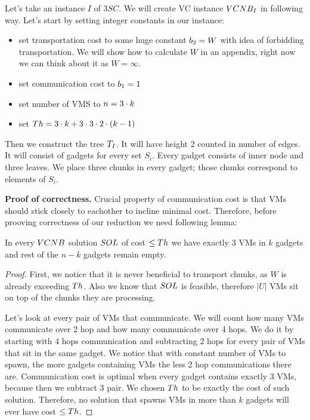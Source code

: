 Let's take an instance $I$ of $3SC$. We will create VC instance $VCNB_I$ in following
way. Let's start by setting integer constants in our instance:
\begin{itemize}
\item set transportation cost to some huge constant $b_2 = W$
  with idea of forbidding transportation. We will show how to
  calculate $W$ in an appendix, right now we can think about it as $W
  = \infty$.
\item set communication cost to $b_1 = 1$
\item set number of VMS to $n = 3 \cdot k$
\item set $Th =  3 \cdot k + 3 \cdot 3 \cdot 2 \cdot (k - 1)$
\end{itemize}


Then we construct the tree $T_I$. It will have height 2 counted in number of
edges. It will consist of gadgets for every set $S_i$. Every gadget
consists of inner node and three leaves. We place three chunks in
every gadget; those chunks correspond to elements of $S_i$.

\textbf{Proof of correctness.}
Crucial property of communication cost is that VMs should stick
closely to eachother to incline minimal cost. Therefore, before
prooving correctness of our reduction we need following lemma:

\begin{lemma}
In every $VCNB$ solution $SOL$ of cost $\leq Th$ we have exactly
$3$ VMs in $k$ gadgets and rest of the $n-k$ gadgets remain empty.
\end{lemma}
\begin{proof}
First, we notice that it is never beneficial to
transport chunks, as $W$ is already exceeding $Th$. Also we know that
$SOL$ is feasible, therefore $|U|$ VMs sit on top of the chunks they
are processing.

Let's look at every pair of VMs that communicate. We
will count how many VMs communicate over 2 hop and how many
communicate over 4 hops. We do it by starting with 4 hops
communication and subtracting 2 hops for every pair of VMs that sit in
the same gadget. We notice that with constant number of VMs to spawn,
the more gadgets containing VMs the less 2 hop communications there
are. Communication cost is optimal when every gadget contains exactly
3 VMs, because then we subtract 3 pair. We chosen $Th$ to be exactly
the cost of such solution. Therefore, no solution that spawns VMs in
more than $k$ gadgets will ever have cost $\leq Th$.
\end{proof}

